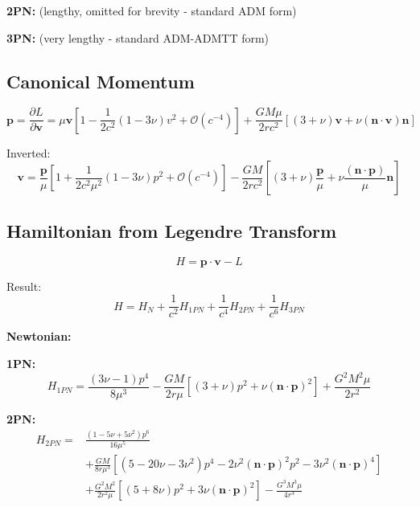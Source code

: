 \documentclass[11pt,a4paper]{article}
\theoremstyle{definition}
\theoremstyle{remark}
\begin{document}
	\textbf{2PN:} (lengthy, omitted for brevity - standard ADM form)
	
	\textbf{3PN:} (very lengthy - standard ADM-ADMTT form)
	
	\subsection{Canonical Momentum}
	
	\begin{equation}
		\mathbf{p} = \frac{\partial L}{\partial \mathbf{v}} = \mu\mathbf{v}\left[1 - \frac{1}{2c^2}(1-3\nu)v^2 + \mathcal{O}(c^{-4})\right] + \frac{GM\mu}{2rc^2}\left[(3+\nu)\mathbf{v} + \nu(\mathbf{n}\cdot\mathbf{v})\mathbf{n}\right]
	\end{equation}
	
	Inverted:
	\begin{equation}
		\mathbf{v} = \frac{\mathbf{p}}{\mu}\left[1 + \frac{1}{2c^2\mu^2}(1-3\nu)p^2 + \mathcal{O}(c^{-4})\right] - \frac{GM}{2rc^2}\left[(3+\nu)\frac{\mathbf{p}}{\mu} + \nu\frac{(\mathbf{n}\cdot\mathbf{p})}{\mu}\mathbf{n}\right]
	\end{equation}
	
	\subsection{Hamiltonian from Legendre Transform}
	
	\begin{equation}
		H = \mathbf{p}\cdot\mathbf{v} - L
	\end{equation}
	
	Result:
	\begin{equation}\label{eq:hamiltonian_full}
		\boxed{H = H_N + \frac{1}{c^2}H_{1PN} + \frac{1}{c^4}H_{2PN} + \frac{1}{c^6}H_{3PN}}
	\end{equation}
	
	\textbf{Newtonian:}
	
	\textbf{1PN:}
	\begin{equation}\label{eq:H_1pn}
		\boxed{H_{1PN} = \frac{(3\nu-1)p^4}{8\mu^3} - \frac{GM}{2r\mu}\left[(3+\nu)p^2 + \nu(\mathbf{n}\cdot\mathbf{p})^2\right] + \frac{G^2M^2\mu}{2r^2}}
	\end{equation}
	
	\textbf{2PN:}
	\begin{equation}\label{eq:H_2pn}
		\boxed{\begin{aligned}
				H_{2PN} = &\frac{(1-5\nu+5\nu^2)p^6}{16\mu^5}\\
				&+ \frac{GM}{8r\mu^3}\left[(5-20\nu-3\nu^2)p^4 - 2\nu^2(\mathbf{n}\cdot\mathbf{p})^2 p^2 - 3\nu^2(\mathbf{n}\cdot\mathbf{p})^4\right]\\
				&+ \frac{G^2M^2}{2r^2\mu}\left[(5+8\nu)p^2 + 3\nu(\mathbf{n}\cdot\mathbf{p})^2\right] - \frac{G^3M^3\mu}{4r^3}
		\end{aligned}}
	\end{equation}
	
\end{document}
